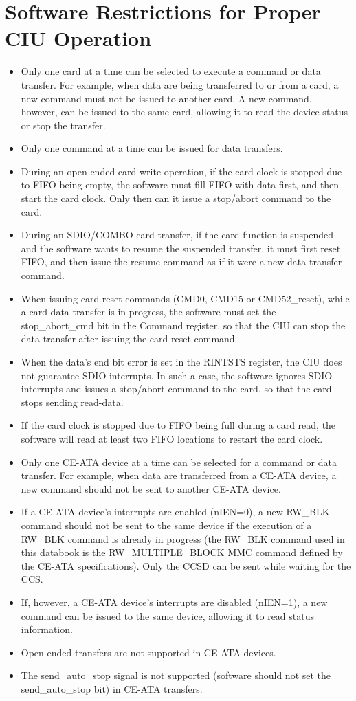 \documentclass[main\_\_EN.tex]{subfiles}
\begin{document}
\section{Software Restrictions for Proper CIU Operation}
\begin{itemize}
	\item Only one card at a time can be selected to execute a command or data transfer. For example, when data are being transferred to or from a card, a new command must not be issued to another card. A new command, however, can be issued to the same card, allowing it to read the device status or stop the transfer.
	\item Only one command at a time can be issued for data transfers.
	\item During an open-ended card-write operation, if the card clock is stopped due to FIFO being empty, the software must fill FIFO with data first, and then start the card clock. Only then can it issue a stop/abort command to the card.
	\item During an SDIO/COMBO card transfer, if the card function is suspended and the software wants to resume the suspended transfer, it must first reset FIFO, and then issue the resume command as if it were a new data-transfer command.
	\item When issuing card reset commands (CMD0, CMD15 or CMD52\_reset), while a card data transfer is in progress, the software must set the stop\_abort\_cmd bit in the Command register, so that the CIU can stop the data transfer after issuing the card reset command.
	\item When the data's end bit error is set in the RINTSTS register, the CIU does not guarantee SDIO interrupts. In such a case, the software ignores SDIO interrupts and issues a stop/abort command to the card, so that the card stops sending read-data.
    \item If the card clock is stopped due to FIFO being full during a card read, the software will read at least two FIFO locations to restart the card clock.
	\item Only one CE-ATA device  at a time can be selected for a command or data transfer. For example, when data are transferred from a CE-ATA device, a new command should not be sent to another CE-ATA device.
	\item If a CE-ATA device's interrupts are enabled (nIEN=0), a new RW\_BLK command should not be sent to the same device if the execution of a RW\_BLK command is already in progress (the RW\_BLK command used in this databook is the RW\_MULTIPLE\_BLOCK MMC command defined by the CE-ATA specifications). Only the CCSD can be sent while waiting for the CCS.
	\item If, however, a CE-ATA device's interrupts are disabled (nIEN=1), a new command can be issued to the same device, allowing it to read status information.
	\item Open-ended transfers are not supported in CE-ATA devices.
	\item The send\_auto\_stop signal is not supported (software should not set the send\_auto\_stop bit) in CE-ATA transfers.
\end{itemize}
\end{document}
